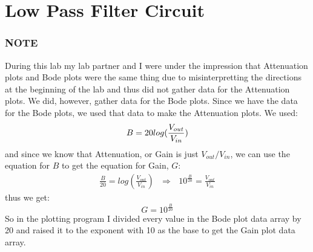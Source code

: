 \documentclass{article}
\begin{document}
\section{Low Pass Filter Circuit}
\subsubsection*{NOTE}
During this lab my lab partner and I were under the impression that Attenuation plots and Bode plots were the same thing due to misinterpretting the directions at the beginning of the lab and thus did not gather data for the Attenuation plots. We did, however, gather data for the Bode plots. Since we have the data for the Bode plots, we used that data to make the Attenuation plots. We used:
\begin{equation}
    B = 20log(\frac{V_{out}}{V_{in}})\\
\end{equation}
and since we know that Attenuation, or Gain is just $V_{out}/V_{in}$, we can use the equation for $B$ to get the equation for Gain, $G$:
\begin{align}
    \frac{B}{20} = log(\frac{V_{out}}{V_{in}})\text{ } \Rightarrow \text{ } 10^{\frac{B}{20}} = \frac{V_{out}}{V_{in}}
\end{align}
thus we get:
\begin{equation}
    G = 10^{\frac{B}{20}}\label{eq:Gain}
\end{equation}
So in the plotting program I divided every value in the Bode plot data array by 20 and raised it to the exponent with 10 as the base to get the Gain plot data array.
\end{document}
